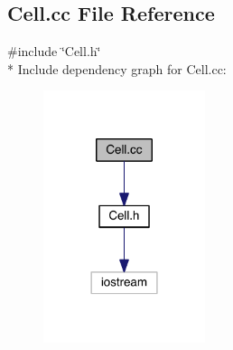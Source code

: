 \hypertarget{a00095}{}\subsection{Cell.\+cc File Reference}
\label{a00095}
{\ttfamily \#include \char`\"{}Cell.\+h\char`\"{}}\\*
Include dependency graph for Cell.\+cc\+:\nopagebreak
\begin{figure}[H]
\begin{center}
\leavevmode
\includegraphics[width=134pt]{a00131}
\end{center}
\end{figure}
